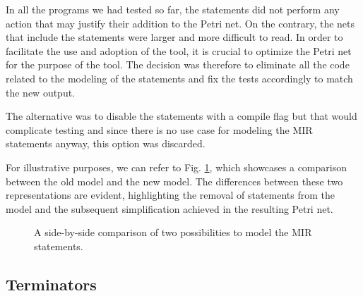 In all the programs we had tested so far, the statements did not perform any action
that may justify their addition to the Petri net.
On the contrary, the nets that include the statements were larger and more difficult to read.
In order to facilitate the use and adoption of the tool,
it is crucial to optimize the Petri net for the purpose of the tool.
The decision was therefore to eliminate all the code related to the modeling of the statements
and fix the tests accordingly to match the new output.

The alternative was to disable the statements with a compile flag
but that would complicate testing and
since there is no use case for modeling the \acrshort{MIR} statements anyway, this option was discarded.

For illustrative purposes, we can refer to Fig. \ref{fig:statement-model-comparison},
which showcases a comparison between the old model and the new model.
The differences between these two representations are evident,
highlighting the removal of statements from the model and
the subsequent simplification achieved in the resulting Petri net.

\begin{figure}[!htb]
  \centering
  
  \caption{A side-by-side comparison of two possibilities to model the MIR statements.}
  \label{fig:statement-model-comparison}
\end{figure}

\subsection{Terminators}
\label{sec:terminators}
